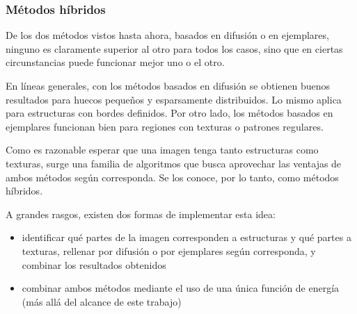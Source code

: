 \documentclass[assd_tpf_main.tex]{subfiles}
\begin{document}
\subsubsection{M\'etodos h\'ibridos}
De los dos m\'etodos vistos hasta ahora, basados en difusi\'on o en ejemplares, ninguno es claramente superior al otro para todos los casos, sino que en ciertas circunstancias puede funcionar mejor uno o el otro.

En l\'ineas generales, con los m\'etodos basados en difusi\'on se obtienen buenos resultados para huecos peque\~nos y esparsamente distribuidos. Lo mismo aplica para estructuras con bordes definidos. Por otro lado, los m\'etodos basados en ejemplares funcionan bien para regiones con texturas o patrones regulares.

Como es razonable esperar que una imagen tenga tanto estructuras como texturas, surge una familia de algoritmos que busca aprovechar las ventajas de ambos m\'etodos seg\'un corresponda. Se los conoce, por lo tanto, como m\'etodos h\'ibridos.

A grandes rasgos, existen dos formas de implementar esta idea:

\begin{itemize}
	\item identificar qu\'e partes de la imagen corresponden a estructuras y qu\'e 
	partes a texturas, rellenar por difusi\'on o por ejemplares seg\'un corresponda, 
	y combinar los resultados obtenidos
	\item combinar ambos m\'etodos mediante el uso de una \'unica funci\'on de
	energ\'ia (m\'as all\'a del alcance de este trabajo)
\end{itemize}
\end{document}
